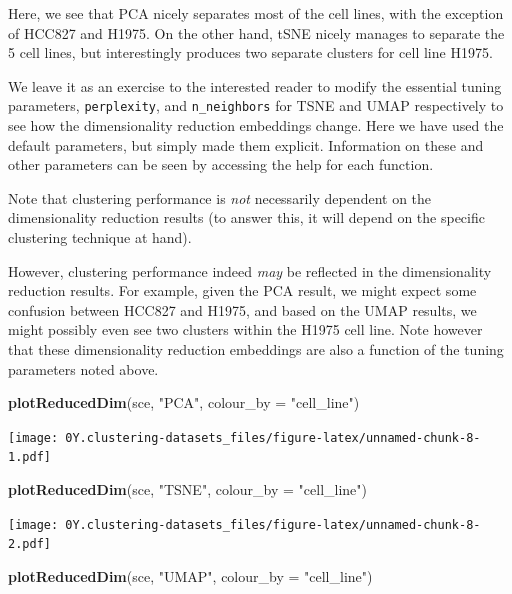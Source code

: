 \documentclass[]{book}
\newenvironment{Shaded}{\begin{snugshade}}{\end{snugshade}}
\newcommand{\DataTypeTok}[1]{\textcolor[rgb]{0.13,0.29,0.53}{#1}}
\newcommand{\KeywordTok}[1]{\textcolor[rgb]{0.13,0.29,0.53}{\textbf{#1}}}
\newcommand{\NormalTok}[1]{#1}
\newcommand{\StringTok}[1]{\textcolor[rgb]{0.31,0.60,0.02}{#1}}
\begin{document}
Here, we see that PCA nicely separates most of the cell lines, with the exception of HCC827 and H1975. On the other hand, tSNE nicely manages to separate the 5 cell lines, but interestingly produces two separate clusters for cell line H1975.

We leave it as an exercise to the interested reader to modify the essential tuning parameters, \texttt{perplexity}, and \texttt{n\_neighbors} for TSNE and UMAP respectively to see how the dimensionality reduction embeddings change. Here we have used the default parameters, but simply made them explicit. Information on these and other parameters can be seen by accessing the help for each function.

Note that clustering performance is \emph{not} necessarily dependent on the dimensionality reduction results (to answer this, it will depend on the specific clustering technique at hand).

However, clustering performance indeed \emph{may} be reflected in the dimensionality reduction results. For example, given the PCA result, we might expect some confusion between HCC827 and H1975, and based on the UMAP results, we might possibly even see two clusters within the H1975 cell line. Note however that these dimensionality reduction embeddings are also a function of the tuning parameters noted above.

\begin{Shaded}
\begin{Highlighting}[]
\KeywordTok{plotReducedDim}\NormalTok{(sce, }\StringTok{"PCA"}\NormalTok{, }\DataTypeTok{colour_by =} \StringTok{"cell_line"}\NormalTok{)}
\end{Highlighting}
\end{Shaded}

\texttt{[image: 0Y.clustering-datasets\_files/figure-latex/unnamed-chunk-8-1.pdf]}

\begin{Shaded}
\begin{Highlighting}[]
\KeywordTok{plotReducedDim}\NormalTok{(sce, }\StringTok{"TSNE"}\NormalTok{, }\DataTypeTok{colour_by =} \StringTok{"cell_line"}\NormalTok{)}
\end{Highlighting}
\end{Shaded}

\texttt{[image: 0Y.clustering-datasets\_files/figure-latex/unnamed-chunk-8-2.pdf]}

\begin{Shaded}
\begin{Highlighting}[]
\KeywordTok{plotReducedDim}\NormalTok{(sce, }\StringTok{"UMAP"}\NormalTok{, }\DataTypeTok{colour_by =} \StringTok{"cell_line"}\NormalTok{)}
\end{Highlighting}
\end{Shaded}
\end{document}
